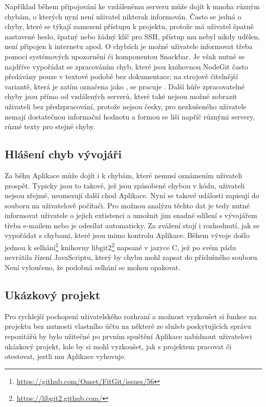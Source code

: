 Například během připojování ke vzdálenému serveru může dojít k mnoha různým chybám, o kterých nyní není uživatel nikterak informován. Často se jedná o chyby, které se týkají zamezení přístupu k projektu, protože má uživatel špatně nastavené heslo, špatný nebo žádný klíč pro SSH, přístup mu nebyl nikdy udělen, není připojen k internetu apod. O chybách je možné uživatele informovat třeba pomocí systémových upozornění či komponentou Snackbar. Je však nutné se najdříve vypořádat se zpracováním chyb, které jsou knihovnou NodeGit často předávány pouze v textové podobě bez dokumentace; na strojově čitelnější variantě, která je zatím označena jako , se pracuje \cite{nodegit-error-codes}. Další hůře zpracovatelné chyby jsou přímo od vzdálených serverů, které také nejsou možné zobrazit uživateli bez předzpracování, protože nejsou česky, pro nezkušeného uživatele nemají dostatečnou informační hodnotu a formou se liší napříč různými servery, různé texty pro stejné chyby.

\subsection{Hlášení chyb vývojáři}

Za běhu Aplikace může dojít i k chybám, které nemusí oznámením uživateli prospět. Typicky jsou to takové, jež jsou způsobené chybou v kódu, uživateli nejsou zřejmé, neomezují další chod Aplikace. Nyní se takové události zapisují do souboru na uživatelově počítači. Pro možnou analýzu těchto dat je tedy nutné informovat uživatele o jejich extistenci a umožnit jim snadné sdílení s vývojářem třeba e-mailem nebo je odesílat automaticky. Za zvážení stojí i rozhodnutí, jak se vypořádat s chybami, které jsou mimo kontrolu Aplikace. Během vývoje došlo jednou k selhání\footnote{\url{https://github.com/Onset/FitGit/issues/56}} knihovny libgit2\footnote{\url{https://libgit2.github.com/}} napsané v jazyce C, jež po svém pádu nevrátila řízení JavaScriptu, který by chybu mohl zapsat do příslušného souboru. Není vyloučeno, že podobná selhání se mohou opakovat.

\subsection{Ukázkový projekt}

Pro rychlejší pochopení uživatelského rozhraní a možnost vyzkoušet si funkce na projektu bez nutnosti vlastního účtu na některé ze služeb poskytujících správu repozitářů by bylo užitečné po prvním spuštění Aplikace nabídnout uživatelovi ukázkový projekt, kde by si mohl vyzkoušet, jak s projektem pracovat či otestovat, jestli mu Aplikace vyhovuje.


